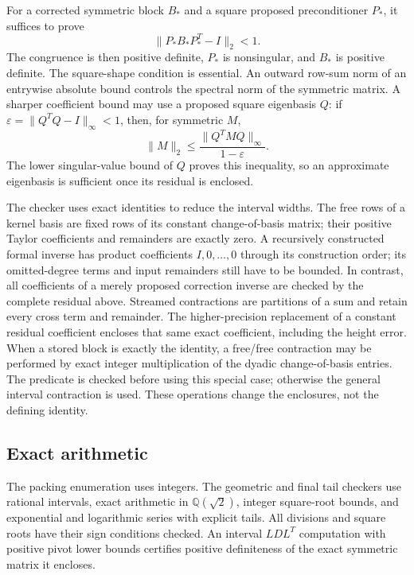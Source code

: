 \documentclass[12pt,reqno]{amsart}
\theoremstyle{definition}
\numberwithin{equation}{section}
\begin{document}
For a corrected symmetric block $B_*$ and a square proposed
preconditioner $P_*$, it suffices to prove
\begin{equation}\label{arith:positive}
 \|P_*B_*P_*^T-I\|_2<1.
\end{equation}
The congruence is then positive definite, $P_*$ is nonsingular, and
$B_*$ is positive definite. The square-shape condition is essential.
An outward row-sum norm of an entrywise absolute bound controls the
spectral norm of the symmetric matrix. A sharper coefficient bound
may use a proposed square eigenbasis $Q$: if
$\varepsilon=\|Q^TQ-I\|_\infty<1$, then, for symmetric $M$,
\[
 \|M\|_2\le\frac{\|Q^TMQ\|_\infty}{1-\varepsilon}.
\]
The lower singular-value bound of $Q$ proves this inequality, so an
approximate eigenbasis is sufficient once its residual is enclosed.

The checker uses exact identities to reduce the interval widths.
The free rows of a kernel basis are fixed rows of its constant
change-of-basis matrix; their positive Taylor coefficients and
remainders are exactly zero. A recursively constructed formal inverse
has product coefficients $I,0,\ldots,0$ through its construction order;
its omitted-degree terms and input remainders still have to be bounded.
In contrast, all coefficients of a merely proposed correction inverse
are checked by the complete residual above. Streamed contractions are
partitions of a sum and retain every cross term and remainder.
The higher-precision replacement of a constant residual coefficient
encloses that same exact coefficient, including the height error.
When a stored block is exactly the identity, a free/free contraction
may be performed by exact integer multiplication of the dyadic
change-of-basis entries. The predicate is checked before using this
special case; otherwise the general interval contraction is used.
These operations change the enclosures, not the defining identity.

\subsection{Exact arithmetic}
The packing enumeration uses integers. The geometric and final tail
checkers use rational intervals, exact arithmetic in
$\mathbb Q(\sqrt2)$, integer square-root bounds, and exponential and
logarithmic series with explicit tails. All divisions and square roots
have their sign conditions checked. An interval $LDL^T$ computation
with positive pivot lower bounds certifies positive definiteness of
the exact symmetric matrix it encloses.
\end{document}
